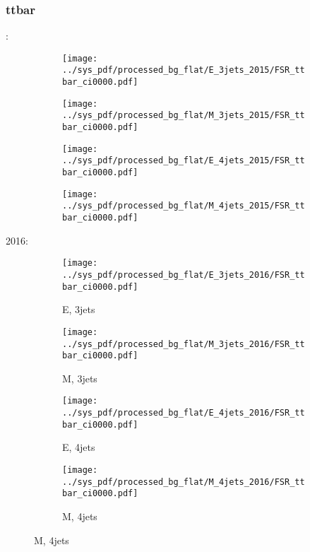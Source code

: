 \documentclass{beamer}
\begin{document}
\begin{frame}
\frametitle{ttbar}
\fontsize{5}{1}:
\begin{figure}
\centering
\begin{subfigure}[b]{0.24\textwidth}
\texttt{[image: ../sys\_pdf/processed\_bg\_flat/E\_3jets\_2015/FSR\_ttbar\_ci0000.pdf]}
\end{subfigure}
\begin{subfigure}[b]{0.24\textwidth}
\texttt{[image: ../sys\_pdf/processed\_bg\_flat/M\_3jets\_2015/FSR\_ttbar\_ci0000.pdf]}
\end{subfigure}
\begin{subfigure}[b]{0.24\textwidth}
\texttt{[image: ../sys\_pdf/processed\_bg\_flat/E\_4jets\_2015/FSR\_ttbar\_ci0000.pdf]}
\end{subfigure}
\begin{subfigure}[b]{0.24\textwidth}
\texttt{[image: ../sys\_pdf/processed\_bg\_flat/M\_4jets\_2015/FSR\_ttbar\_ci0000.pdf]}
\end{subfigure}
\end{figure}
2016:
\begin{figure}
\centering
\begin{subfigure}[b]{0.24\textwidth}
\texttt{[image: ../sys\_pdf/processed\_bg\_flat/E\_3jets\_2016/FSR\_ttbar\_ci0000.pdf]}
\captionsetup{font=tiny}
\caption{E, 3jets}
\end{subfigure}
\begin{subfigure}[b]{0.24\textwidth}
\texttt{[image: ../sys\_pdf/processed\_bg\_flat/M\_3jets\_2016/FSR\_ttbar\_ci0000.pdf]}
\captionsetup{font=tiny}
\caption{M, 3jets}
\end{subfigure}
\begin{subfigure}[b]{0.24\textwidth}
\texttt{[image: ../sys\_pdf/processed\_bg\_flat/E\_4jets\_2016/FSR\_ttbar\_ci0000.pdf]}
\captionsetup{font=tiny}
\caption{E, 4jets}
\end{subfigure}
\begin{subfigure}[b]{0.24\textwidth}
\texttt{[image: ../sys\_pdf/processed\_bg\_flat/M\_4jets\_2016/FSR\_ttbar\_ci0000.pdf]}
\captionsetup{font=tiny}
\caption{M, 4jets}
\end{subfigure}
\end{figure}
\end{frame}
\end{document}
